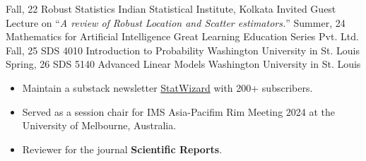 \documentclass[11pt]{developercv} %
\begin{document}
\begin{entrylist}
    \vspace*{-10pt}
    \entry
    {Fall, 22}
    {Robust Statistics}
    {Indian Statistical Institute, Kolkata}
    {\small Invited Guest Lecture on ``\emph{A review of Robust Location and Scatter estimators.}''}
    \vspace*{-20pt}
    \entry
    {Summer, 24}
    {Mathematics for Artificial Intelligence}
    {Great Learning Education Series Pvt. Ltd.}
    {}
    \vspace*{-20pt}
    \entry
    {Fall, 25}
    {SDS 4010 Introduction to Probability}
    {Washington University in St. Louis}
    {}
    \vspace*{-20pt}
    \entry
    {Spring, 26}
    {SDS 5140 Advanced Linear Models}
    {Washington University in St. Louis}
    {}
\end{entrylist}




\vspace{-6pt}
\begin{itemize}[noitemsep]
    \item Maintain a substack newsletter \href{https://statwizard.substack.com/?showWelcome=true}{StatWizard} with 200+ subscribers.
    \item Served as a session chair for IMS Asia-Pacifim Rim Meeting 2024 at the University of Melbourne, Australia.
    \item Reviewer for the journal \textbf{Scientific Reports}.
\end{itemize}
\end{document}

